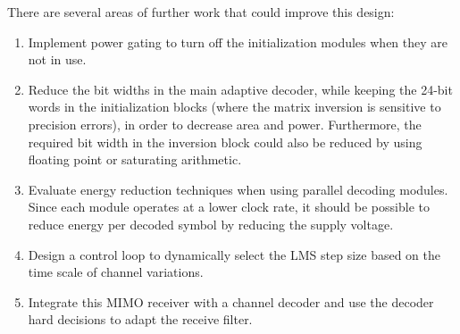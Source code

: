\documentclass[journal]{IEEEtran}
\begin{document}
There are several areas of further work that could improve this design:
\begin{enumerate}
\item Implement power gating to turn off the initialization modules when they are not in use.
\item Reduce the bit widths in the main adaptive decoder, while keeping the 24-bit words in the initialization blocks (where the matrix inversion is sensitive to precision errors), in order to decrease area and power. Furthermore, the required bit width in the inversion block could also be reduced by using floating point or saturating arithmetic.
\item Evaluate energy reduction techniques when using parallel decoding modules. Since each module operates at a lower clock rate, it should be possible to reduce energy per decoded symbol by reducing the supply voltage.
\item Design a control loop to dynamically select the LMS step size based on the time scale of channel variations.
\item Integrate this MIMO receiver with a channel decoder and use the decoder hard decisions to adapt the receive filter.
\end{enumerate}





\end{document}
